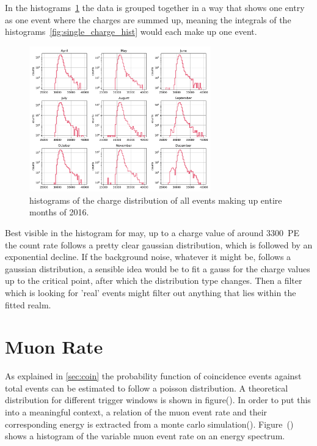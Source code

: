 In the histograms~\ref{fig:monthly_charge_hist} the data is grouped together in a way that shows one entry as one event where the charges are summed up, meaning the 
integrals of the histograms~\ref{fig:single_charge_hist} would each make up one event. 

\begin{figure}
    \centering
    \includegraphics[width=0.7\textwidth]{Plots/monthly_charge_hist.pdf}
    \caption{histograms of the charge distribution of all events making up entire months of 2016.}
    \label{fig:monthly_charge_hist}
\end{figure}

Best visible in the histogram for may, up to a charge value of around \SI{3300}{PE} the count rate follows a pretty clear gaussian distribution, which is followed 
by an exponential decline. If the background noise, whatever it might be, follows a gaussian distribution, a sensible idea would be to fit a gauss for the charge 
values up to the critical point, after which the distribution type changes. Then a filter which is looking for 'real' events might filter out anything that lies 
within the fitted realm. 

\section{Muon Rate}

As explained in \ref{sec:coin} the probability function of coincidence events against total events can be estimated to follow a poisson distribution.
A theoretical distribution for different trigger windows is shown in figure(). In order to put this into a meaningful context, a relation of the muon event rate and their 
corresponding energy is extracted from a monte carlo simulation(). Figure~() shows a histogram of the variable muon event rate on an energy spectrum. 

